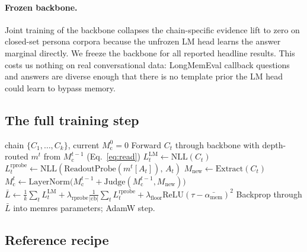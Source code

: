 \documentclass[11pt]{article}
\newcommand{\Mc}{M_{\mathrm{c}}}
\newcommand{\mt}{m^t}
\newcommand{\Mnew}{M_{\mathrm{new}}}
\newcommand{\amem}{\alpha_{\mathrm{mem}}}
\begin{document}
\paragraph{Frozen backbone.}
Joint training of the backbone collapses the chain-specific evidence
lift to zero on closed-set persona corpora because the unfrozen LM
head learns the answer marginal directly. We freeze the backbone for
all reported headline results.
This costs us nothing on real conversational data: LongMemEval
callback questions and answers are diverse enough that there is no
template prior the LM head could learn to bypass memory.

\subsection{The full training step}

\begin{algorithm}[t]
\caption{One training step (single micro-batch). Backbone frozen;
gradients flow only through memres parameters.}
\label{alg:tbptt}
\begin{algorithmic}[1]
\Require chain $\{C_1,\dots,C_k\}$, current $\Mc^0 = 0$
  \State Forward $C_t$ through backbone with depth-routed $\mt$ from $\Mc^{t-1}$ (Eq.~\ref{eq:read})
  \State $L^{\mathrm{LM}}_t \gets \mathrm{NLL}(C_t)$
     \State $L^{\mathrm{rprobe}}_t \gets \mathrm{NLL}(\mathrm{ReadoutProbe}(\mt[A_t]),\, A_t)$
  \EndIf
  \State $\Mnew \gets \mathrm{Extract}(C_t)$ 
  \State $\Mc^t \gets \mathrm{LayerNorm}\bigl(\Mc^{t-1} + \mathrm{Judge}(\Mc^{t-1}, \Mnew)\bigr)$ 
\EndFor
\State $\bar{L} \gets \frac{1}{k}\sum_t L^{\mathrm{LM}}_t
       + \lambda_{\mathrm{rprobe}} \frac{1}{|\mathrm{cb}|}\sum_t L^{\mathrm{rprobe}}_t
       + \lambda_{\mathrm{floor}} \mathrm{ReLU}(\tau - \bar{\amem})^2$
\State Backprop through $\bar{L}$ into memres parameters; AdamW step.
\end{algorithmic}
\end{algorithm}

\subsection{Reference recipe}
\label{sec:reference_recipe}
\end{document}
